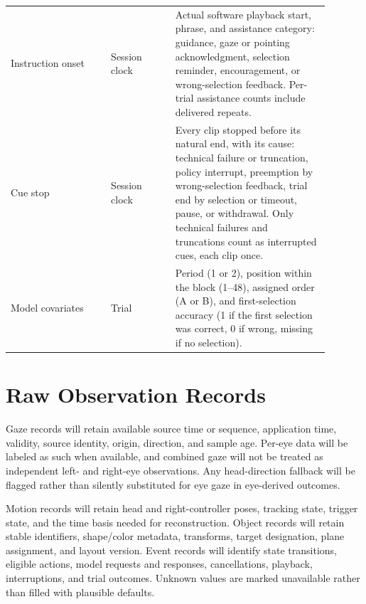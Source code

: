 \begin{longtable}{@{}p{0.28\linewidth}p{0.18\linewidth}p{0.43\linewidth}@{}}
Instruction onset & Session clock & Actual software playback start, phrase, and assistance category: guidance, gaze or pointing acknowledgment, selection reminder, encouragement, or wrong-selection feedback. Per-trial assistance counts include delivered repeats.\\
Cue stop & Session clock & Every clip stopped before its natural end, with its cause: technical failure or truncation, policy interrupt, preemption by wrong-selection feedback, trial end by selection or timeout, pause, or withdrawal. Only technical failures and truncations count as interrupted cues, each clip once.\\
Model covariates & Trial & Period (1 or 2), position within the block (1--48), assigned order (A or B), and first-selection accuracy (1 if the first selection was correct, 0 if wrong, missing if no selection).\\\bottomrule
\end{longtable}
\endgroup

\section{Raw Observation Records}
Gaze records will retain available source time or sequence, application time, validity, source identity, origin, direction, and sample age. Per-eye data will be labeled as such when available, and combined gaze will not be treated as independent left- and right-eye observations. Any head-direction fallback will be flagged rather than silently substituted for eye gaze in eye-derived outcomes.

Motion records will retain head and right-controller poses, tracking state, trigger state, and the time basis needed for reconstruction. Object records will retain stable identifiers, shape/color metadata, transforms, target designation, plane assignment, and layout version. Event records will identify state transitions, eligible actions, model requests and responses, cancellations, playback, interruptions, and trial outcomes. Unknown values are marked unavailable rather than filled with plausible defaults.

